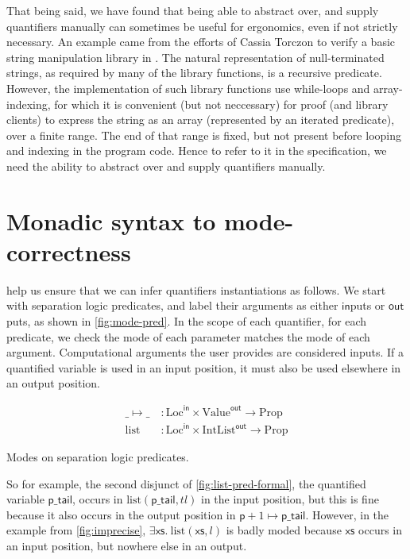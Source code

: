 That being said, we have found that being able to abstract over, and supply
quantifiers manually can sometimes be useful for ergonomics, even if not
strictly necessary. An example came from the efforts of Cassia Torczon to
verify a basic string manipulation library in .%
 The natural representation of null-terminated strings, as
required by many of the library functions, is a recursive predicate. However,
the implementation of such library functions use while-loops and
array-indexing, for which it is convenient (but not neccessary) for proof (and
library clients) to express the string as an array (represented by an iterated
predicate), over a finite range. The end of that range is fixed, but not
present before looping and indexing in the program code. Hence to refer to it
in the specification, we need the ability to abstract over and supply
quantifiers manually.

\section{Monadic syntax to mode-correctness}\label{sec:monadic-syntax}

 help us ensure that we can infer quantifiers instantiations
as follows. We start with separation logic predicates, and label their
arguments as either $\mathsf{in}$puts or $\mathsf{out}$puts, as shown in
\cref{fig:mode-pred}. In the scope of each quantifier, for each predicate, we
check the mode of each parameter matches the mode of each argument.
Computational arguments the user provides are considered inputs. If a
quantified variable is used in an input position, it must also be used
elsewhere in an output position.

\begin{marginfigure}
    \centering
    \begin{align*}
        \_ \mapsto{} \_ \:&: \mathrm{Loc}^{\mathsf{in}} \times \mathrm{Value}^{\mathsf{out}} \rightarrow \mathrm{Prop} \\
        \mathrm{list} \:&: \mathrm{Loc}^{\mathsf{in}} \times \mathrm{IntList}^{\mathsf{out}} \rightarrow \mathrm{Prop}
    \end{align*}
    \caption{Modes on separation logic predicates.}\label{fig:mode-pred}
\end{marginfigure}

So for example, the second disjunct of \cref{fig:list-pred-formal}, the
quantified variable $\mathsf{p\_tail}$, occurs in $\mathrm{list}
(\mathsf{p\_tail}, {tl})$ in the input position, but this is fine because it also
occurs in the output position in $\mathsf{p} + 1 \mapsto{} \mathsf{p\_tail}$.
However, in the example from \cref{fig:imprecise}, $\exists \mathsf{xs}. \
\mathrm{list}(\mathsf{xs},l)$ is badly moded because $\mathsf{xs}$ occurs in an
input position, but nowhere else in an output.

